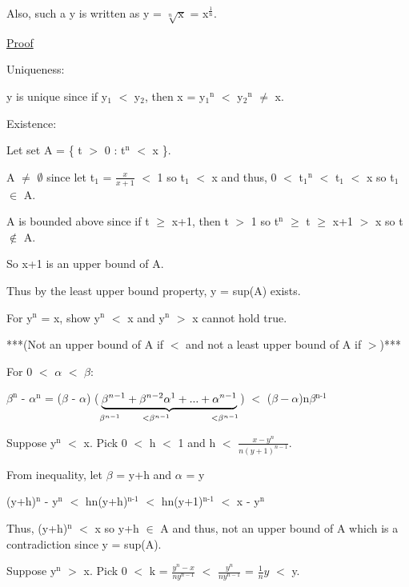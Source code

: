 	\qquad Also, such a y is written as y = $\sqrt[n]{\text{x}}$ = x$^{\frac{1}{\text{n}}}$.

{ \color{magenta} \underline{Proof} } 

	{ \color{lblue} Uniqueness: }

	y is unique since if y$_{1}$ $<$ y$_{2}$, then
	x = y$_{1}$$^\text{n}$ $<$ y$_{2}$$^\text{n}$ $\neq$ x.

	{ \color{lblue} Existence: }

	Let set A = \{ t $>$ 0 : t$^\text{n}$ $<$ x \}.

	A $\not =$ $\emptyset$ since let t$_{1}$ = $\frac{x}{x+1}$ $<$ 1 so t$_1$ $<$ x
	and thus, 0 $<$ t$_{1}$$^\text{n}$ $<$ t$_{1}$ $<$ x so t$_{1}$ $\in$ A.

	A is bounded above since if t $ \geq $ x+1, then
	t $>$ 1 so t$^\text{n}$ $ \geq $ t $ \geq $ x+1 $>$ x so t $\not \in$ A.

	So x+1 is an upper bound of A.

	Thus by the least upper bound property, y = sup(A) exists.

	For y$^\text{n}$ = x, show y$^\text{n}$ $<$ x and y$^\text{n}$ $>$ x cannot hold true.

	***(Not an upper bound of A if $<$ and not a least upper bound of A if $>$)***

	For 0 $<$ $\alpha$ $<$ $\beta$:

	\qquad $\beta ^\text{n}$ - $\alpha^\text{n}$
	= ($\beta$ - $\alpha$) ($\underbrace{\beta^{n-1} + \beta^{n-2}\alpha^1 + ... + \alpha^{n-1}}
	_{\beta^{n-1} \hspace{0.7cm} <\beta^{n-1} \hspace{1.3cm} <\beta^{n-1}}$)
	$<$ ($\beta - \alpha$)n$\beta$$^\text{n-1}$ 

	Suppose y$^\text{n}$ $<$ x. Pick 0 $<$ h $<$ 1 and h $<$ $\frac{x-y^n}{n(y+1)^{n-1}}$.

	\qquad From inequality, let $\beta$ = y+h and $\alpha$ = y

	\qquad \qquad (y+h)$^\text{n}$ - y$^\text{n}$ $<$ hn(y+h)$^\text{n-1}$
	$<$ hn(y+1)$^\text{n-1}$ $<$ x - y$^\text{n}$

	\begin{adjustbox}{minipage=14.2cm, right, vspace=0.1cm 0cm}
		Thus, (y+h)$^\text{n}$ $<$ x so y+h $\in$ A and thus, not an upper bound of A
		which is a contradiction since y = sup(A).
	\end{adjustbox}

	Suppose y$^\text{n}$ $>$ x.
	Pick 0 $<$ k = $\frac{y^n - x}{ny^{n-1}}$ $<$ $\frac{y^n}{ny^{n-1}}$
	= $\frac{1}{n}y$ $<$ y.

